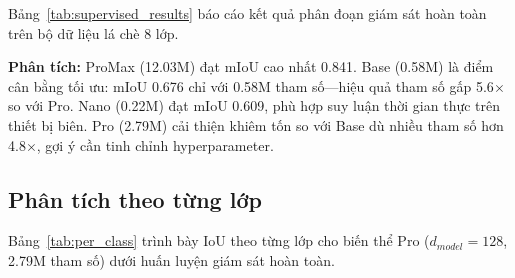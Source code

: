\documentclass[conference]{IEEEtran}
\begin{document}
Bảng~\ref{tab:supervised_results} báo cáo kết quả phân đoạn giám sát hoàn toàn trên bộ dữ liệu lá chè 8 lớp.

\begin{table}[t]
\centering
\caption{Phân loại lá chè giám sát hoàn toàn --- so sánh với baselines}
\label{tab:supervised_results}
\end{table}

\noindent \textbf{Phân tích:} ProMax (12.03M) đạt mIoU cao nhất 0.841. Base (0.58M) là điểm cân bằng tối ưu: mIoU 0.676 chỉ với 0.58M tham số---hiệu quả tham số gấp 5.6$\times$ so với Pro. Nano (0.22M) đạt mIoU 0.609, phù hợp suy luận thời gian thực trên thiết bị biên. Pro (2.79M) cải thiện khiêm tốn so với Base dù nhiều tham số hơn 4.8$\times$, gợi ý cần tinh chỉnh hyperparameter.

\subsection{Phân tích theo từng lớp}

Bảng~\ref{tab:per_class} trình bày IoU theo từng lớp cho biến thể Pro ($d_{model}=128$, 2.79M tham số) dưới huấn luyện giám sát hoàn toàn.
\end{document}
